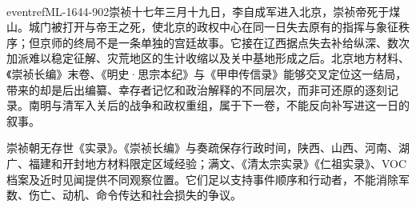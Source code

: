 \\eventref{ML-1644-902}{崇祯十七年三月十九日，李自成军进入北京，崇祯帝死于煤山。}城门被打开与帝王之死，使北京的政权中心在同一日失去原有的指挥与象征秩序；但京师的终局不是一条单独的宫廷故事。它接在辽西据点失去补给纵深、数次加派难以稳定征解、灾荒地区的生计收缩以及关中基地形成之后。北京地方材料、《崇祯长编》末卷、《明史·思宗本纪》与《甲申传信录》能够交叉定位这一结局，带来的却是后出编纂、幸存者记忆和政治解释的不同层次，而非可还原的逐刻记录。南明与清军入关后的战争和政权重组，属于下一卷，不能反向补写进这一日的叙事。

\begin{debate}
崇祯朝无存世《实录》。《崇祯长编》与奏疏保存行政时间，陕西、山西、河南、湖广、福建和开封地方材料限定区域经验；满文、《清太宗实录》《仁祖实录》、VOC档案及近时见闻提供不同观察位置。它们足以支持事件顺序和行动者，不能消除军数、伤亡、动机、命令传达和社会损失的争议。
\end{debate}
